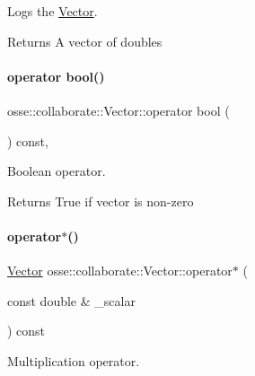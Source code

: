 Logs the \hyperlink{classosse_1_1collaborate_1_1_vector}{Vector}. 

\begin{DoxyReturn}{Returns}
A vector of doubles 
\end{DoxyReturn}
\mbox{\label{classosse_1_1collaborate_1_1_vector_adadeade94ada0735d117526a0f996c40}} 
\paragraph{\texorpdfstring{operator bool()}{operator bool()}}
{\footnotesize\ttfamily osse\+::collaborate\+::\+Vector\+::operator bool (\begin{DoxyParamCaption}{ }\end{DoxyParamCaption}) const\hspace{0.3cm}{\ttfamily [inline]}, {\ttfamily [explicit]}}



Boolean operator. 

\begin{DoxyReturn}{Returns}
True if vector is non-\/zero 
\end{DoxyReturn}
\mbox{\label{classosse_1_1collaborate_1_1_vector_a091294293b9af4b040f8784fa9b74cab}} 
\paragraph{\texorpdfstring{operator$\ast$()}{operator*()}}
{\footnotesize\ttfamily \hyperlink{classosse_1_1collaborate_1_1_vector}{Vector} osse\+::collaborate\+::\+Vector\+::operator$\ast$ (\begin{DoxyParamCaption}\item[{const double \&}]{\+\_\+scalar }\end{DoxyParamCaption}) const\hspace{0.3cm}{\ttfamily [inline]}}



Multiplication operator. 


